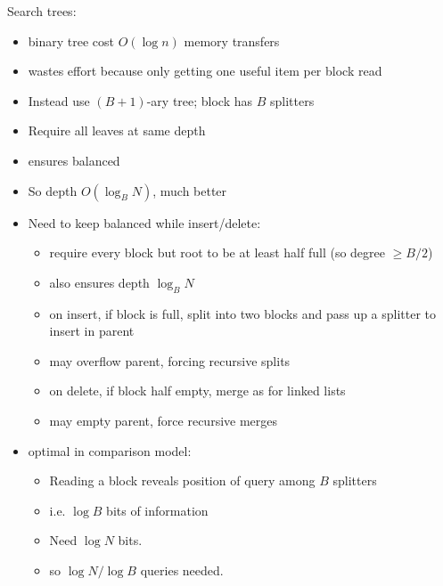 \documentclass{article}
\begin{document}

Search trees:
\begin{itemize}
\item binary tree cost $O(\log n)$ memory transfers
\item wastes effort because only getting one useful item per block
  read
\item Instead use $(B+1)$-ary tree; block has $B$ splitters
\item Require all leaves at same depth
\item ensures balanced
\item So depth $O(\log_B N)$, much better
\item Need to keep balanced while insert/delete:
  \begin{itemize}
  \item require every block but root to be at least half full (so degree $\ge
  B/2$)
\item also ensures depth $\log_B N$
  \item on insert, if block is full, split into two blocks and pass up a
    splitter to insert in parent
  \item may overflow parent, forcing recursive splits
  \item on delete, if block half empty, merge as for linked lists
  \item may empty parent, force recursive merges
  \end{itemize}
\item optimal in comparison model:
  \begin{itemize}
  \item Reading a block reveals position of query among $B$ splitters
  \item i.e. $\log B$ bits of information
  \item Need $\log N$ bits.
  \item so $\log N/\log B$ queries needed.
  \end{itemize}
\end{itemize}

\end{document}
